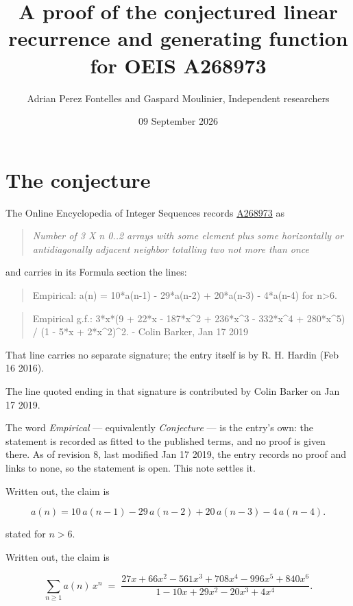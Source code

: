 \documentclass[11pt]{article}
\title{A proof of the conjectured linear recurrence and generating function for OEIS A268973}
\author{Adrian Perez Fontelles and Gaspard Moulinier, Independent researchers}
\date{09 September 2026}
\theoremstyle{definition}
\begin{document}
\maketitle
\section{The conjecture}

The Online Encyclopedia of Integer Sequences records \href{https://oeis.org/A268973}{A268973} as

\begin{quote}\itshape Number of 3 X n 0..2 arrays with some element plus some horizontally or antidiagonally adjacent neighbor totalling two not more than once\end{quote}

and carries in its Formula section the lines:

\begin{quote}\ttfamily Empirical: a(n) = 10*a(n-1) - 29*a(n-2) + 20*a(n-3) - 4*a(n-4) for n>6.\end{quote}

\begin{quote}\ttfamily Empirical g.f.: 3*x*(9 + 22*x - 187*x\textasciicircum{}2 + 236*x\textasciicircum{}3 - 332*x\textasciicircum{}4 + 280*x\textasciicircum{}5) / (1 - 5*x + 2*x\textasciicircum{}2)\textasciicircum{}2. - Colin Barker, Jan 17 2019\end{quote}

That line carries no separate signature; the entry itself is by R. H. Hardin (Feb 16 2016).

The line quoted ending in that signature is contributed by Colin Barker on Jan 17 2019.

The word {\itshape Empirical} --- equivalently {\itshape Conjecture} --- is the entry's own: the statement is recorded as fitted to the published terms, and no proof is given there. As of revision 8, last modified Jan 17 2019, the entry records no proof and links to none, so the statement is open. This note settles it.

Written out, the claim is

\[a(n) = 10\,a(n-1) - 29\,a(n-2) + 20\,a(n-3) - 4\,a(n-4).\]

stated for $n > 6$.

Written out, the claim is

\[\sum_{n \ge 1} a(n)\,x^n \;=\; \frac{27x + 66x^{2} - 561x^{3} + 708x^{4} - 996x^{5} + 840x^{6}}{1 - 10x + 29x^{2} - 20x^{3} + 4x^{4}}.\]
\end{document}
